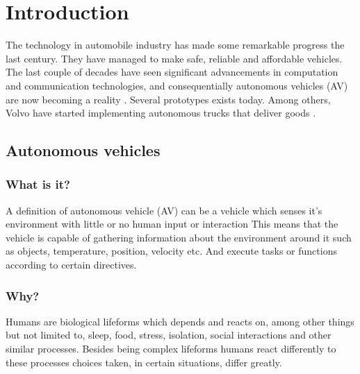 \documentclass[conference]{IEEEtran}
\begin{document}

\begin{abstract}
\end{abstract}


%
\IEEEpeerreviewmaketitle

\section{Introduction}
 The technology in automobile industry has made some remarkable progress the last century. They have managed to
 make safe, reliable and affordable vehicles. The last couple of decades have seen significant advancements
 in computation and communication technologies, and consequentially autonomous vehicles (AV) are now becoming a reality \cite{IEEE:AutonomousCars}.
 Several prototypes exists today. Among others, Volvo have started implementing autonomous trucks that deliver goods \cite{Sawers2019}.
 \subsection{Autonomous vehicles}
	 \subsubsection{What is it?}
		 A definition of autonomous vehicle (AV) can be a vehicle which senses it's environment with little or no human input or interaction
		 This means that the vehicle is capable of gathering information about the environment around it such as objects, temperature, position, velocity etc. And
		 execute tasks or functions according to certain directives.
	 \subsubsection{Why?}
		 Humans are biological lifeforms which depends and reacts on, among other things but not limited to, sleep, food,
		 stress, isolation, social interactions and other similar processes. Besides being complex lifeforms
		 humans react differently to these processes choices taken, in certain situations, differ greatly.
\end{document}
